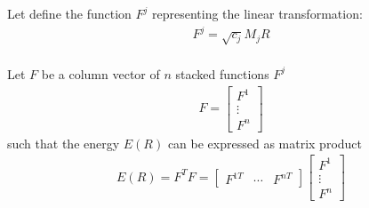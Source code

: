 \documentclass{birkjour}
\numberwithin{equation}{section}
\begin{document}
Let define the function $F^j$ representing the linear transformation:
\begin{eqnarray*}
F^j = \sqrt{c_j} M_j R\\
\end{eqnarray*}

Let $F$ be a column vector of $n$ stacked functions $F^j$
\begin{eqnarray*}
F = \left[\begin{array}{c}F^1 \\ \vdots \\ F^n\end{array}\right]
\end{eqnarray*}
 such that the energy $E(R)$ can be expressed as matrix product
\begin{eqnarray*}
E(R) = F^T F =
\left[\begin{array}{ccc}F^{1T} & \cdots & F^{nT}\end{array}\right]
\left[\begin{array}{c}F^1 \\ \vdots \\ F^n\end{array}\right]
\end{eqnarray*}
\end{document}
